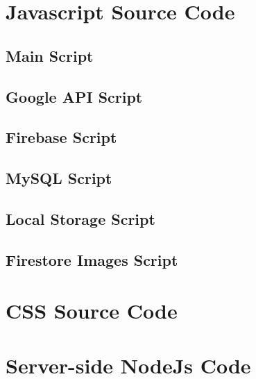 \documentclass[letterpaper]{article}
\begin{document}
\section{Javascript Source Code}
\subsection{Main Script}

\newpage
\subsection{Google API Script}

\newpage
\subsection{Firebase Script}

\newpage
\subsection{MySQL Script}

\newpage
\subsection{Local Storage Script}

\newpage
\subsection{Firestore Images Script}

\newpage

\section{CSS Source Code}

\newpage

\section{Server-side NodeJs Code}

\end{document}
